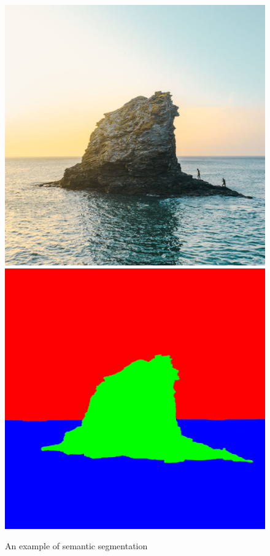 \begin{figure}[H]
  \centering
{}
  \includegraphics[width=\linewidth]{imgs/landscape.jpg}
\endminipage \hspace{0.2cm}
%
  \includegraphics[width=\linewidth]{imgs/landscape_mask.jpg}
\endminipage
\caption{An example of semantic segmentation}
\end{figure}

\newpage